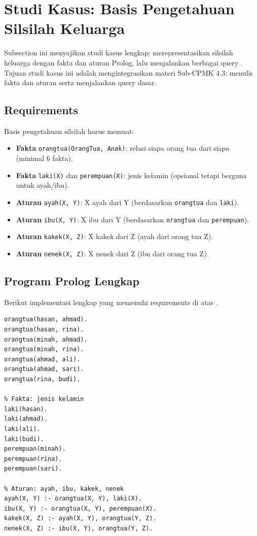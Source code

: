 \section{Studi Kasus: Basis Pengetahuan Silsilah Keluarga}

Subsection ini menyajikan studi kasus lengkap: merepresentasikan silsilah keluarga dengan fakta dan aturan Prolog, lalu menjalankan berbagai query \cite{learn_prolog,swi_manual}. Tujuan studi kasus ini adalah mengintegrasikan materi Sub-CPMK 4.3: menulis fakta dan aturan serta menjalankan query dasar.

\subsection{Requirements}

Basis pengetahuan silsilah harus memuat:
\begin{itemize}[leftmargin=*, nosep]
  \item \textbf{Fakta} \texttt{orangtua(OrangTua, Anak)}: relasi siapa orang tua dari siapa (minimal 6 fakta).
  \item \textbf{Fakta} \texttt{laki(X)} dan \texttt{perempuan(X)}: jenis kelamin (opsional tetapi berguna untuk ayah/ibu).
  \item \textbf{Aturan} \texttt{ayah(X, Y)}: X ayah dari Y (berdasarkan \texttt{orangtua} dan \texttt{laki}).
  \item \textbf{Aturan} \texttt{ibu(X, Y)}: X ibu dari Y (berdasarkan \texttt{orangtua} dan \texttt{perempuan}).
  \item \textbf{Aturan} \texttt{kakek(X, Z)}: X kakek dari Z (ayah dari orang tua Z).
  \item \textbf{Aturan} \texttt{nenek(X, Z)}: X nenek dari Z (ibu dari orang tua Z).
\end{itemize}

\subsection{Program Prolog Lengkap}

Berikut implementasi lengkap yang memenuhi requirements di atas \cite{learn_prolog,swi_prolog}.

\begin{lstlisting}[style=prologstyle, caption={Program silsilah keluarga: fakta dan aturan}]
% Fakta: orangtua(OrangTua, Anak)
orangtua(hasan, ahmad).
orangtua(hasan, rina).
orangtua(minah, ahmad).
orangtua(minah, rina).
orangtua(ahmad, ali).
orangtua(ahmad, sari).
orangtua(rina, budi).

% Fakta: jenis kelamin
laki(hasan).
laki(ahmad).
laki(ali).
laki(budi).
perempuan(minah).
perempuan(rina).
perempuan(sari).

% Aturan: ayah, ibu, kakek, nenek
ayah(X, Y) :- orangtua(X, Y), laki(X).
ibu(X, Y) :- orangtua(X, Y), perempuan(X).
kakek(X, Z) :- ayah(X, Y), orangtua(Y, Z).
nenek(X, Z) :- ibu(X, Y), orangtua(Y, Z).
\end{lstlisting}

